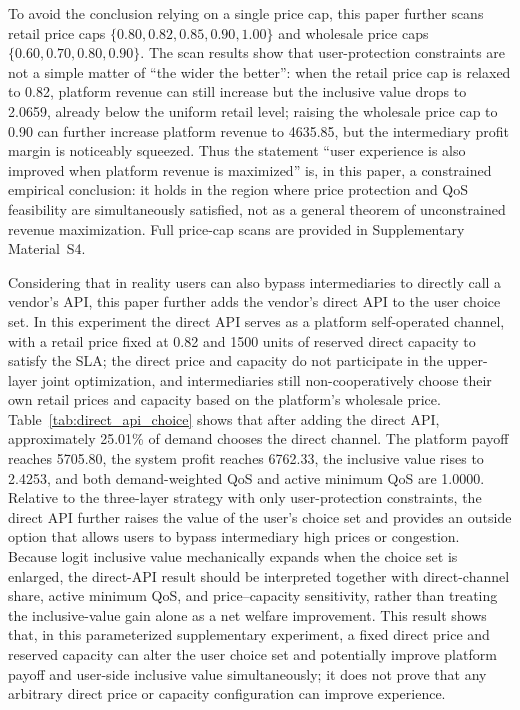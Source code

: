 \documentclass[11pt,a4paper]{article}
\begin{document}
To avoid the conclusion relying on a single price cap, this paper further scans retail price caps $\{0.80,0.82,0.85,0.90,1.00\}$ and wholesale price caps $\{0.60,0.70,0.80,0.90\}$. The scan results show that user-protection constraints are not a simple matter of ``the wider the better'': when the retail price cap is relaxed to 0.82, platform revenue can still increase but the inclusive value drops to 2.0659, already below the uniform retail level; raising the wholesale price cap to 0.90 can further increase platform revenue to 4635.85, but the intermediary profit margin is noticeably squeezed. Thus the statement ``user experience is also improved when platform revenue is maximized'' is, in this paper, a constrained empirical conclusion: it holds in the region where price protection and QoS feasibility are simultaneously satisfied, not as a general theorem of unconstrained revenue maximization. Full price-cap scans are provided in Supplementary Material~S4.

Considering that in reality users can also bypass intermediaries to directly call a vendor's API, this paper further adds the vendor's direct API to the user choice set. In this experiment the direct API serves as a platform self-operated channel, with a retail price fixed at 0.82 and 1500 units of reserved direct capacity to satisfy the SLA; the direct price and capacity do not participate in the upper-layer joint optimization, and intermediaries still non-cooperatively choose their own retail prices and capacity based on the platform's wholesale price. Table~\ref{tab:direct_api_choice} shows that after adding the direct API, approximately 25.01\% of demand chooses the direct channel. The platform payoff reaches 5705.80, the system profit reaches 6762.33, the inclusive value rises to 2.4253, and both demand-weighted QoS and active minimum QoS are 1.0000. Relative to the three-layer strategy with only user-protection constraints, the direct API further raises the value of the user's choice set and provides an outside option that allows users to bypass intermediary high prices or congestion. Because logit inclusive value mechanically expands when the choice set is enlarged, the direct-API result should be interpreted together with direct-channel share, active minimum QoS, and price--capacity sensitivity, rather than treating the inclusive-value gain alone as a net welfare improvement. This result shows that, in this parameterized supplementary experiment, a fixed direct price and reserved capacity can alter the user choice set and potentially improve platform payoff and user-side inclusive value simultaneously; it does not prove that any arbitrary direct price or capacity configuration can improve experience.
\end{document}
